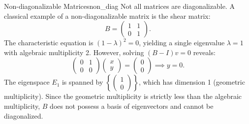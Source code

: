 \begin{remark}{Non-diagonalizable Matrices}{non_diag}
    Not all matrices are diagonalizable. A classical example of a non-diagonalizable matrix is the shear matrix:
    \begin{equation*}
        B = \begin{pmatrix} 1 & 1 \\ 0 & 1 \end{pmatrix}.
    \end{equation*}
    The characteristic equation is $(1-\lambda)^2 = 0$, yielding a single eigenvalue $\lambda = 1$ with algebraic multiplicity 2. However, solving $(B - I)v = 0$ reveals:
    \begin{equation*}
        \begin{pmatrix} 0 & 1 \\ 0 & 0 \end{pmatrix}\begin{pmatrix} x \\ y \end{pmatrix} = \begin{pmatrix} 0 \\ 0 \end{pmatrix} \implies y = 0.
    \end{equation*}
    The eigenspace $E_1$ is spanned by $\left\{\begin{pmatrix} 1 \\ 0 \end{pmatrix}\right\}$, which has dimension 1 (geometric multiplicity). Since the geometric multiplicity is strictly less than the algebraic multiplicity, $B$ does not possess a basis of eigenvectors and cannot be diagonalized.
\end{remark}
